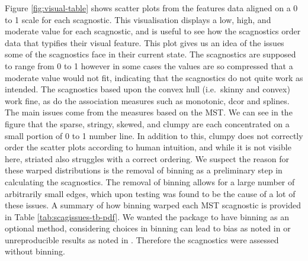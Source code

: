 Figure \ref{fig:visual-table} shows scatter plots from the features data aligned on a 0 to 1 scale for each scagnostic. This visualisation displays a low, high, and moderate value for each scagnostic, and is useful to see how the scagnostics order data that typifies their visual feature. This plot gives us an idea of the issues some of the scagnostics face in their current state. The scagnostics are supposed to range from 0 to 1 however in some cases the values are so compressed that a moderate value would not fit, indicating that the scagnostics do not quite work as intended. The scagnostics based upon the convex hull (i.e.~skinny and convex) work fine, as do the association measures such as monotonic, dcor and splines. The main issues come from the measures based on the MST. We can see in the figure that the sparse, stringy, skewed, and clumpy are each concentrated on a small portion of 0 to 1 number line. In addition to this, clumpy does not correctly order the scatter plots according to human intuition, and while it is not visible here, striated also struggles with a correct ordering. We suspect the reason for these warped distributions is the removal of binning as a preliminary step in calculating the scagnostics. The removal of binning allows for a large number of arbitrarily small edges, which upon testing was found to be the cause of a lot of these issues. A summary of how binning warped each MST scagnostic is provided in Table \ref{tab:scagissues-tb-pdf}. We wanted the package to have binning as an optional method, considering choices in binning can lead to bias as noted in \citet{scagdist} or unreproducible results as noted in \citet{robust}. Therefore the scagnostics were assessed without binning.

